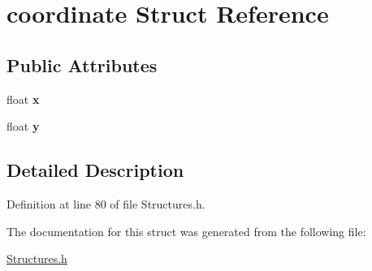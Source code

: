 \hypertarget{structcoordinate}{\section{coordinate Struct Reference}
\label{structcoordinate}
}
\subsection*{Public Attributes}
\begin{DoxyCompactItemize}
\item 
\hypertarget{structcoordinate_acde0819ef9d30b7ce25b7d833d3df327}{float {\bfseries x}}\label{structcoordinate_acde0819ef9d30b7ce25b7d833d3df327}

\item 
\hypertarget{structcoordinate_ad48911206c84b1a8306a7023900ff622}{float {\bfseries y}}\label{structcoordinate_ad48911206c84b1a8306a7023900ff622}

\end{DoxyCompactItemize}


\subsection{Detailed Description}


Definition at line 80 of file Structures.\+h.



The documentation for this struct was generated from the following file\+:\begin{DoxyCompactItemize}
\item 
\hyperlink{_structures_8h}{Structures.\+h}\end{DoxyCompactItemize}
